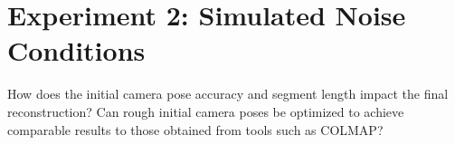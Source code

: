 \begin{comment}
The size of the images, or their resolution, has a complex impact on model performance. While higher resolution images contribute to higher fidelity renders, the metrics could suggest otherwise due to their increased sensitivity to minor differences in synthesized and ground-truth images. Hence, resolution can impact the quality of synthesized images and their metric scores, and it is crucial to align it with the number of frames for efficient coverage of input pixels.

Vehicle speed is a significant factor when capturing synthetic data, particularly due to the influence of motion blur and temporal artifacts on image quality. Faster vehicle speeds can lead to increased blur and distortion, making it challenging for the NeRF to learn the scene structure and appearance. Conversely, slower speeds provide clearer and more detailed images, improving the quality of the training data. Furthermore, slower speeds result in a larger dataset due to the increased number of images captured.

In conclusion, each of these factors—camera setup, capacity, number of frames, image size, and vehicle speed—has a unique and important influence on the quality of synthetic data captured for training NeRF models. Their careful consideration is essential for optimizing the performance of the resulting models.
\end{comment}








\section{Experiment 2: Simulated Noise Conditions}
\begin{description}[leftmargin=!,labelwidth=\widthof{RQ 1:}]
\item[\textbf{RQ 2:}] How does the initial camera pose accuracy and segment length impact the final reconstruction? Can rough initial camera poses be optimized to achieve comparable results to those obtained from tools such as COLMAP?
\end{description}

